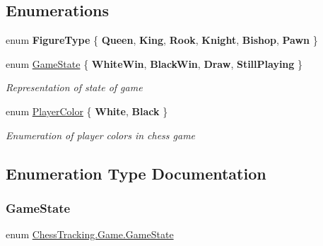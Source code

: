 \subsection*{Enumerations}
\begin{DoxyCompactItemize}
\item 
\mbox{\label{namespace_chess_tracking_1_1_game_abebeae749ec5907b7d0513907e6dfd03}} 
enum {\bfseries Figure\+Type} \{ \newline
{\bfseries Queen}, 
{\bfseries King}, 
{\bfseries Rook}, 
{\bfseries Knight}, 
\newline
{\bfseries Bishop}, 
{\bfseries Pawn}
 \}
\item 
enum \mbox{\hyperlink{namespace_chess_tracking_1_1_game_acd441ca4d0791bf4bf7fa8ec204a1ed7}{Game\+State}} \{ {\bfseries White\+Win}, 
{\bfseries Black\+Win}, 
{\bfseries Draw}, 
{\bfseries Still\+Playing}
 \}
\begin{DoxyCompactList}\small\item\em Representation of state of game \end{DoxyCompactList}\item 
enum \mbox{\hyperlink{namespace_chess_tracking_1_1_game_ab79070a55977a8c8326e9cdda7dcfa9a}{Player\+Color}} \{ {\bfseries White}, 
{\bfseries Black}
 \}
\begin{DoxyCompactList}\small\item\em Enumeration of player colors in chess game \end{DoxyCompactList}\end{DoxyCompactItemize}


\subsection{Enumeration Type Documentation}
\mbox{\label{namespace_chess_tracking_1_1_game_acd441ca4d0791bf4bf7fa8ec204a1ed7}} 
\subsubsection{\texorpdfstring{GameState}{GameState}}
{\footnotesize\ttfamily enum \mbox{\hyperlink{namespace_chess_tracking_1_1_game_acd441ca4d0791bf4bf7fa8ec204a1ed7}{Chess\+Tracking.\+Game.\+Game\+State}}\hspace{0.3cm}{\ttfamily [strong]}}



